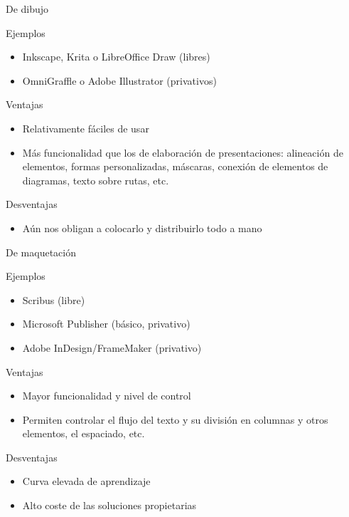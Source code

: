 \documentclass[xcolor=svgnames,compress]{beamer}
\begin{document}
\begin{frame}{De dibujo}

  \begin{block}{Ejemplos}
    \begin{itemize}
    \item Inkscape, Krita o LibreOffice Draw (libres)
    \item OmniGraffle o Adobe Illustrator (privativos)
    \end{itemize}
  \end{block}

  \begin{block}{Ventajas}
    \begin{itemize}
    \item Relativamente fáciles de usar
    \item Más funcionalidad que los de elaboración de presentaciones:
      alineación de elementos, formas personalizadas, máscaras,
      conexión de elementos de diagramas, texto sobre rutas, etc.
    \end{itemize}
  \end{block}

  \begin{block}{Desventajas}
    \begin{itemize}
    \item Aún nos obligan a colocarlo y distribuirlo todo a mano
    \end{itemize}
  \end{block}
  
\end{frame}

\begin{frame}{De maquetación}

  \begin{block}{Ejemplos}
    \begin{itemize}
    \item Scribus (libre)
    \item Microsoft Publisher (básico, privativo)
    \item Adobe InDesign/FrameMaker (privativo)
    \end{itemize}
  \end{block}

  \begin{block}{Ventajas}
    \begin{itemize}
    \item Mayor funcionalidad y nivel de control
    \item Permiten controlar el flujo del texto y su división en
      columnas y otros elementos, el espaciado, etc.
    \end{itemize}
  \end{block}

  \begin{block}{Desventajas}
    \begin{itemize}
    \item Curva elevada de aprendizaje
    \item Alto coste de las soluciones propietarias
    \end{itemize}
  \end{block}

\end{frame}
\end{document}
